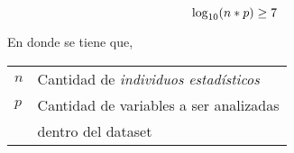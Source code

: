 
\begin{equation} \label{eq-baro2015-1}%
  \log_{10}(n * p) \geq 7 \\
\end{equation}

En donde se tiene que,

\begin{tabular}{l l}
$n$ & Cantidad de \textit{individuos estadísticos}\\
$p$ & Cantidad de variables a ser analizadas \\
    & dentro del \gls{dataset}\\
\end{tabular}

